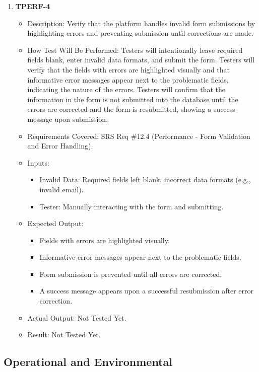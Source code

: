 \documentclass[12pt, titlepage]{article}
\begin{document}
\begin{enumerate}
\item \textbf{TPERF-4}  
    \begin{itemize}
        \item Description: Verify that the platform handles invalid form submissions by highlighting errors and preventing submission until corrections are made.
        \item How Test Will Be Performed: Testers will intentionally leave required fields blank, enter invalid data formats, and submit the form. Testers will verify that the fields with errors are highlighted visually and that informative error messages appear next to the problematic fields, indicating the nature of the errors. Testers will confirm that the information in the form is not submitted into the database until the errors are corrected and the form is resubmitted, showing a success message upon submission.
        \item Requirements Covered: SRS Req \#12.4 (Performance - Form Validation and Error Handling).
        \item Inputs:  
            \begin{itemize}
                \item Invalid Data: Required fields left blank, incorrect data formats (e.g., invalid email).
                \item Tester: Manually interacting with the form and submitting.
            \end{itemize}
        \item Expected Output:  
            \begin{itemize}
                \item Fields with errors are highlighted visually.
                \item Informative error messages appear next to the problematic fields.
                \item Form submission is prevented until all errors are corrected.
                \item A success message appears upon a successful resubmission after error correction.
            \end{itemize}
        \item Actual Output: Not Tested Yet.
        \item Result: Not Tested Yet.
    \end{itemize}

\end{enumerate}

\subsection{Operational and Environmental}
\end{document}
